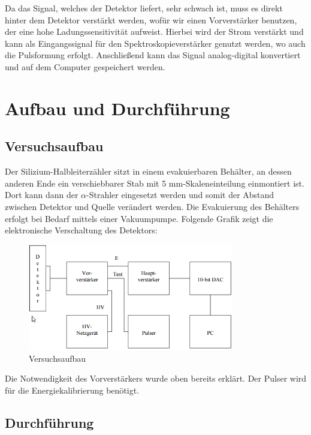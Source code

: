 \documentclass[bigchapter,colorback,accentcolor=tud4b,linedtoc,11pt]{tudreport}
\begin{document}
Da das Signal, welches der Detektor liefert, sehr schwach ist, muss es direkt hinter dem Detektor verstärkt werden, wofür wir einen Vorverstärker benutzen, der eine hohe Ladungssensitivität aufweist. Hierbei wird der Strom verstärkt und kann als Eingangssignal für den Spektroskopieverstärker genutzt werden, wo auch die Pulsformung erfolgt. Anschließend kann das Signal analog-digital konvertiert und auf dem Computer gespeichert werden. 

\chapter{Aufbau und Durchführung}

\section{Versuchsaufbau}

Der Silizium-Halbleiterzähler sitzt in einem evakuierbaren Behälter, an dessen anderen Ende ein verschiebbarer Stab mit 5 mm-Skaleneinteilung einmontiert ist. Dort kann dann der $\alpha$-Strahler eingesetzt werden und somit der Abstand zwischen Detektor und Quelle verändert werden. Die Evakuierung des Behälters erfolgt bei Bedarf mittels einer Vakuumpumpe. Folgende Grafik zeigt die elektronische Verschaltung des Detektors: 

\begin{figure}[h] 
  \centering
     \includegraphics[width=0.8\textwidth]{img/Aufbau.png}
  \caption{Versuchsaufbau \cite{anleitung}}
  \label{fig:Bild1}
\end{figure}

Die Notwendigkeit des Vorverstärkers wurde oben bereits erklärt. Der Pulser wird für die Energiekalibrierung benötigt. 

\section{Durchführung}
\end{document}
